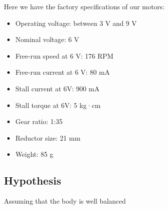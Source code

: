 Here we have the factory specifications of our motors: 
\begin{itemize}
    \item Operating voltage: between 3 V and 9 V
    \item Nominal voltage: 6 V
    \item Free-run speed at 6 V: 176 RPM
    \item Free-run current at 6 V: 80 mA
    \item Stall current at 6V: 900 mA
    \item Stall torque at 6V: 5 kg·cm
    \item Gear ratio: 1:35
    \item Reductor size: 21 mm
    \item Weight: 85 g
\end{itemize}

\subsection{Hypothesis}
Assuming that the body is well balanced
